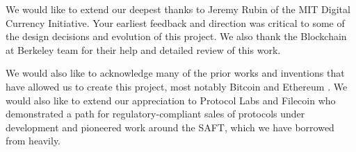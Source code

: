 \documentclass[letterpaper,11pt]{article}
\begin{document}
We would like to extend our deepest thanks to Jeremy Rubin of the MIT Digital Currency Initiative. Your earliest feedback and direction was critical to some of the design decisions and evolution of this project. We also thank the Blockchain at Berkeley team for their help and detailed review of this work.\newline

We would also like to acknowledge many of the prior works and inventions that have allowed us to create this project, most notably Bitcoin \cite{bitcoin} and Ethereum \cite{ethereum}. We would also like to extend our appreciation to Protocol Labs \cite{protocol} and Filecoin \cite{filecoin} who demonstrated a path for regulatory-compliant sales of protocols under development and pioneered work around the SAFT, which we have borrowed from heavily.
\newpage
\end{document}
